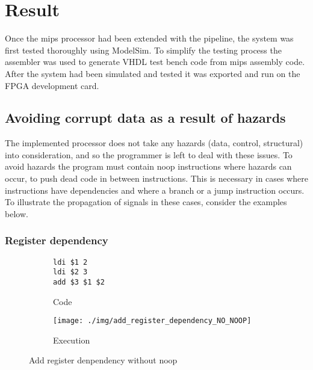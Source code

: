 \section{Result}
\label{sec:result}
Once the mips processor had been extended with the pipeline, the system was first tested thoroughly using ModelSim. To simplify the testing process the assembler was used to generate VHDL test bench code from mips assembly code. After the system had been simulated and tested  it was exported and run on the FPGA development card.

\subsection{Avoiding corrupt data as a result of hazards}
\label{avoiding_corrupt_data}
The implemented processor does not take any hazards (data, control, structural) into consideration, and so the programmer is left to deal with these issues. To avoid hazards the program must contain noop instructions where hazards can occur, to push dead code in between instructions. This is necessary in cases where instructions have dependencies and where a branch or a jump instruction occurs. To illustrate the propagation of signals in these cases, consider the examples below.
\\

\subsubsection{Register dependency} %
\label{subsub:register_dependency}
\begin{figure}[H]
	\begin{subfigure}[b]{.5\linewidth}
		\begin{lstlisting}[language={[mips]Assembler}]
ldi $1 2
ldi $2 3
add $3 $1 $2
		\end{lstlisting}
		\caption{Code}
		\label{code:add_without_noop}
	\end{subfigure}
	\begin{subfigure}[b]{.5\linewidth}
		\centering
		\texttt{[image: ./img/add\_register\_dependency\_NO\_NOOP]}
		\caption{Execution}
		\label{img:add_without_noop}
	\end{subfigure}
	\caption{Add register denpendency without noop}
	\label{add_without_noop}
\end{figure}

